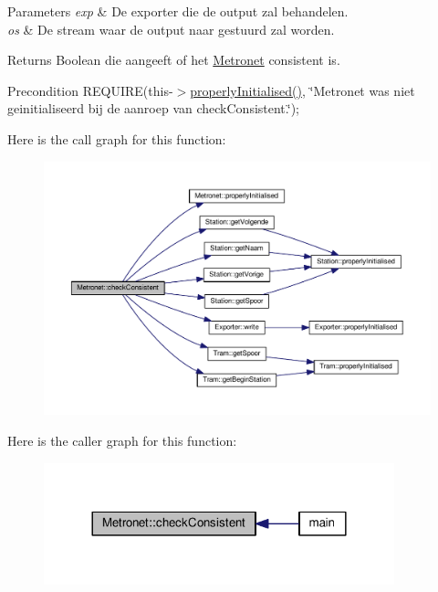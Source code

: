 \begin{DoxyParams}{Parameters}
{\em exp} & De exporter die de output zal behandelen. \\
\hline
{\em os} & De stream waar de output naar gestuurd zal worden. \\
\hline
\end{DoxyParams}
\begin{DoxyReturn}{Returns}
Boolean die aangeeft of het \hyperlink{class_metronet}{Metronet} consistent is. 
\end{DoxyReturn}
\begin{DoxyPrecond}{Precondition}
R\+E\+Q\+U\+I\+RE(this-\/$>$\hyperlink{class_metronet_a3d2adce29a947f162924279b766de645}{properly\+Initialised()}, \char`\"{}\+Metronet was niet geinitialiseerd bij de aanroep van check\+Consistent.\char`\"{}); 
\end{DoxyPrecond}


Here is the call graph for this function\+:\nopagebreak
\begin{figure}[H]
\begin{center}
\leavevmode
\includegraphics[width=350pt]{class_metronet_a3125e980b208f1cdd04a9c26ec92a7bf_cgraph}
\end{center}
\end{figure}




Here is the caller graph for this function\+:\nopagebreak
\begin{figure}[H]
\begin{center}
\leavevmode
\includegraphics[width=288pt]{class_metronet_a3125e980b208f1cdd04a9c26ec92a7bf_icgraph}
\end{center}
\end{figure}


